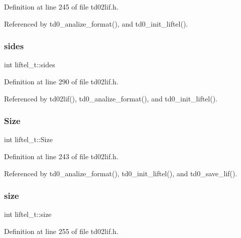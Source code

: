 Definition at line 245 of file td02lif.\+h.



Referenced by td0\+\_\+analize\+\_\+format(), and td0\+\_\+init\+\_\+liftel().

\mbox{\label{structliftel__t_aabd804e27f6ab37de1ef9b890a0f1088}} 
\subsubsection{\texorpdfstring{sides}{sides}}
{\footnotesize\ttfamily int liftel\+\_\+t\+::sides}



Definition at line 290 of file td02lif.\+h.



Referenced by td02lif(), td0\+\_\+analize\+\_\+format(), and td0\+\_\+init\+\_\+liftel().

\mbox{\label{structliftel__t_a9fe4b5bc923dd0ac989c7f0cacf19d30}} 
\subsubsection{\texorpdfstring{Size}{Size}}
{\footnotesize\ttfamily int liftel\+\_\+t\+::\+Size}



Definition at line 243 of file td02lif.\+h.



Referenced by td0\+\_\+analize\+\_\+format(), td0\+\_\+init\+\_\+liftel(), and td0\+\_\+save\+\_\+lif().

\mbox{\label{structliftel__t_a7c0102997f04b216d2ec895495899b7f}} 
\subsubsection{\texorpdfstring{size}{size}}
{\footnotesize\ttfamily int liftel\+\_\+t\+::size}



Definition at line 255 of file td02lif.\+h.



